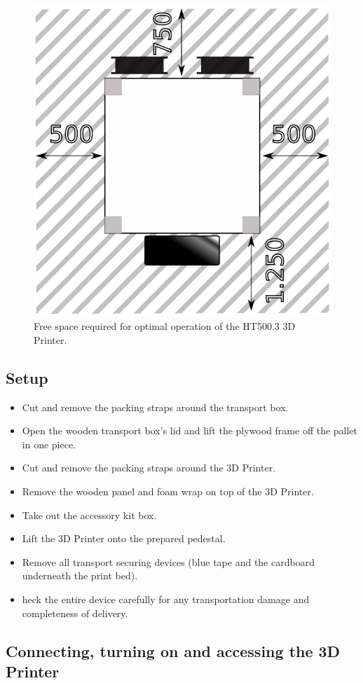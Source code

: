 \begin{figure}[H]
  \centering
  \includegraphics[width=.7\linewidth]{./img/qsg_workspace.png}
  \caption{Free space required for optimal operation of the HT500.3 3D Printer.}
\end{figure}


\subsection*{Setup}

\begin{itemize}
  \item Cut and remove the packing straps around the transport box.
  \item Open the wooden transport box's lid and lift the plywood frame off the 
        pallet in one piece.
  \item Cut and remove the packing straps around the 3D Printer.
  \item Remove the wooden panel and foam wrap on top of the 3D Printer.
  \item Take out the accessory kit box.
  \item Lift the 3D Printer onto the prepared pedestal.
  \item Remove all transport securing devices (blue tape and the cardboard 
        underneath the print bed).
  \item heck the entire device carefully for any transportation damage and 
        completeness of delivery.
\end{itemize}


\subsection*{Connecting, turning on and accessing the 3D Printer}

